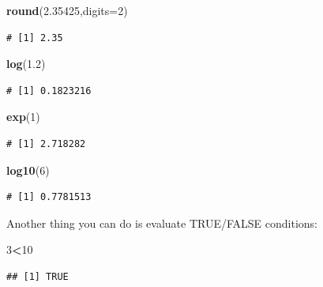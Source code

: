 \documentclass[
  a4paperpaper,
]{book}
\newenvironment{Shaded}{\begin{snugshade}}{\end{snugshade}}
\newcommand{\DataTypeTok}[1]{\textcolor[rgb]{0.13,0.29,0.53}{#1}}
\newcommand{\DecValTok}[1]{\textcolor[rgb]{0.00,0.00,0.81}{#1}}
\newcommand{\FloatTok}[1]{\textcolor[rgb]{0.00,0.00,0.81}{#1}}
\newcommand{\KeywordTok}[1]{\textcolor[rgb]{0.13,0.29,0.53}{\textbf{#1}}}
\newcommand{\NormalTok}[1]{#1}
\newcommand{\OperatorTok}[1]{\textcolor[rgb]{0.81,0.36,0.00}{\textbf{#1}}}
\begin{document}
\begin{Shaded}
\begin{Highlighting}[]
\KeywordTok{round}\NormalTok{(}\FloatTok{2.35425}\NormalTok{,}\DataTypeTok{digits=}\DecValTok{2}\NormalTok{)}
\end{Highlighting}
\end{Shaded}

\begin{verbatim}
# [1] 2.35
\end{verbatim}

\begin{Shaded}
\begin{Highlighting}[]
\KeywordTok{log}\NormalTok{(}\FloatTok{1.2}\NormalTok{)}
\end{Highlighting}
\end{Shaded}

\begin{verbatim}
# [1] 0.1823216
\end{verbatim}

\begin{Shaded}
\begin{Highlighting}[]
\KeywordTok{exp}\NormalTok{(}\DecValTok{1}\NormalTok{)}
\end{Highlighting}
\end{Shaded}

\begin{verbatim}
# [1] 2.718282
\end{verbatim}

\begin{Shaded}
\begin{Highlighting}[]
\KeywordTok{log10}\NormalTok{(}\DecValTok{6}\NormalTok{)}
\end{Highlighting}
\end{Shaded}

\begin{verbatim}
# [1] 0.7781513
\end{verbatim}

Another thing you can do is evaluate TRUE/FALSE conditions:

\begin{Shaded}
\begin{Highlighting}[]
\DecValTok{3}\OperatorTok{\textless{}}\DecValTok{10}
\end{Highlighting}
\end{Shaded}

\begin{verbatim}
## [1] TRUE
\end{verbatim}
\end{document}
